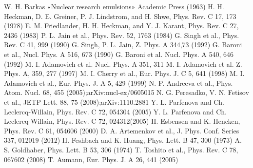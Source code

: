 \documentclass[fontsize=14pt]{scrarticle}
\begin{document}
\begin{thebibliography}{57}
 {W. H. Barkas «Nuclear research emulsions» Academic Press (1963)}
 {H. H. Heckman, D. E. Greiner, P. J. Lindstrom, and H. Shwe, Phys. Rev. C 17, 173 (1978)}
 {E. M. Friedlander, H. H. Heckman, and Y. J. Karant, Phys. Rev. C 27, 2436 (1983)}
 {P. L. Jain et al., Phys. Rev. 52, 1763 (1984)}
 {G. Singh et al., Phys. Rev. C 41, 999 (1990)}
 {G. Singh, P. L. Jain, Z. Phys. A 344,73 (1992)}
 {G. Baroni et al., Nucl. Phys. A 516, 673 (1990)}
 {G. Baroni et al. Nucl. Phys. A 540, 646 (1992)}
 {M. I. Adamovich et al. Nucl. Phys. A 351, 311}
 {M. I. Adamovich et al. Z. Phys. A, 359, 277 (1997)}
 {M. I. Cherry et al., Eur. Phys. J. C 5, 641 (1998)}
 {M. I. Adamovich et al., Eur. Phys. J. A 5, 429 (1999)}
 {N. P. Andreeva et al., Phys. Atom. Nucl. 68, 455 (2005);arXiv:nucl-ex/0605015}
 {N. G. Peresadko, V. N. Fetisov et al., JETP Lett. 88, 75 (2008);arXiv:1110.2881}
 {Y. L. Parfenova and Ch. Leclercq-Willain, Phys. Rev. C 72, 054304 (2005)}
 {Y. L. Parfenova and Ch. Leclercq-Willain, Phys. Rev. C 72, 024312(2005)}
 {H. Esbensen and K. Hencken, Phys. Rev. C 61, 054606 (2000)}
 {D. A. Artemenkov et al., J. Phys. Conf. Series 337, 012019 (2012)}
 {H. Feshbach and K. Huang, Phys. Lett. B 47, 300 (1973)}
 {A. S. Goldhaber, Phys. Lett. B 53, 306 (1974)}
 {T. Toshito et al., Phys. Rev. C 78, 067602 (2008)}
 {T. Aumann, Eur. Phys. J. A 26, 441 (2005)}
\end{thebibliography}
\end{document}
